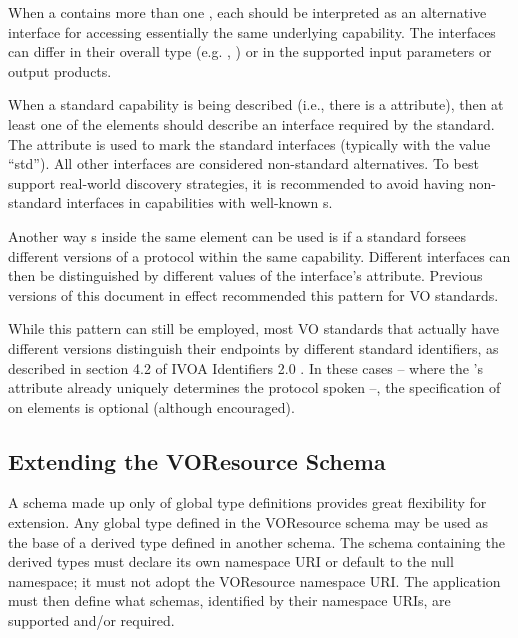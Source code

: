 \documentclass[11pt,a4paper]{ivoa}
\begin{document}
When a  contains more than one
, each  should be
interpreted as an alternative interface for accessing essentially the
same underlying capability.  The interfaces can differ in their
overall type (e.g. ,
) or in the supported input parameters or
output products.


When a standard capability is being described (i.e., there is a
 attribute), then at least one of the
 elements should describe an interface required
by the standard.  The  attribute is used to mark the
standard interfaces (typically with the value ``std'').
All other interfaces are considered non-standard
alternatives.  To best support real-world discovery strategies, it is
recommended to avoid having non-standard interfaces in capabilities
with well-known s.

Another way s inside the same
 element can be used is if a standard forsees
different versions of a protocol within the same capability.  Different
interfaces can then be distinguished by different values of the
interface's  attribute.  Previous versions of this
document in effect recommended this pattern for VO standards.

While this pattern can still be employed, most VO standards that
actually have different versions distinguish their endpoints by
different standard identifiers, as described in section 4.2 of IVOA
Identifiers 2.0 \citep{2016ivoa.spec.0523D}.  In these cases -- where the
's  attribute already uniquely
determines the protocol spoken --, the specification of 
on  elements is optional (although encouraged).

\subsection{Extending the VOResource Schema}

\label{sect:extending}

A schema made up only of global type definitions provides great
flexibility for extension.  Any global type defined in the VOResource
schema may be used as the base of a derived type defined in another
schema.  The schema containing the derived types must declare its own
namespace URI or default to the null namespace; it must not adopt the
VOResource namespace URI.  The application must then define what
schemas, identified by their namespace URIs, are supported and/or
required.
\end{document}
